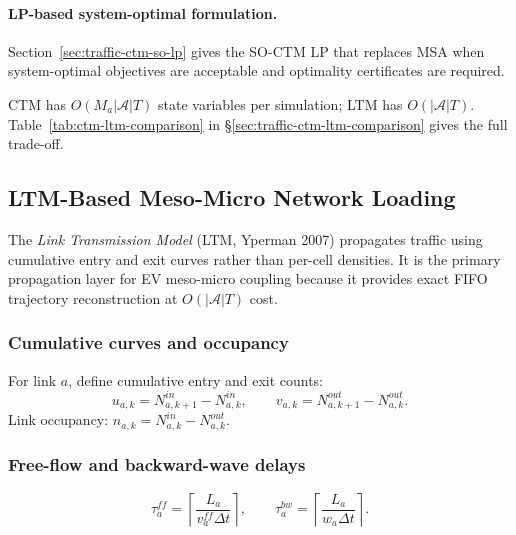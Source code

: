\paragraph{LP-based system-optimal formulation.}
Section~\ref{sec:traffic-ctm-so-lp} gives the SO-CTM LP that replaces
MSA when system-optimal objectives are acceptable and optimality
certificates are required.

\begin{remark}
  CTM has $O(M_a |\mathcal{A}| T)$ state variables per simulation; LTM
  has $O(|\mathcal{A}| T)$.  Table~\ref{tab:ctm-ltm-comparison} in
  \S\ref{sec:traffic-ctm-ltm-comparison} gives the full trade-off.
\end{remark}

\subsection{LTM-Based Meso-Micro Network Loading}
\label{sec:traffic-ltm}

The \emph{Link Transmission Model} (LTM, Yperman 2007) propagates traffic
using cumulative entry and exit curves rather than per-cell densities.
It is the primary propagation layer for EV meso-micro coupling because it
provides exact FIFO trajectory reconstruction at $O(|\mathcal{A}|T)$ cost.

\subsubsection{Cumulative curves and occupancy}

For link $a$, define cumulative entry and exit counts:
\begin{equation}
  u_{a,k} = N^{in}_{a,k+1} - N^{in}_{a,k}, \qquad
  v_{a,k} = N^{out}_{a,k+1} - N^{out}_{a,k}.
  \label{eq:ltm-flows}
\end{equation}
Link occupancy: $n_{a,k} = N^{in}_{a,k} - N^{out}_{a,k}$.

\subsubsection{Free-flow and backward-wave delays}

\begin{equation}
  \tau^{ff}_a = \left\lceil \frac{L_a}{v^{ff}_a \Delta t} \right\rceil,
  \qquad
  \tau^{bw}_a = \left\lceil \frac{L_a}{w_a \Delta t} \right\rceil.
  \label{eq:tau-ff-bw}
\end{equation}

